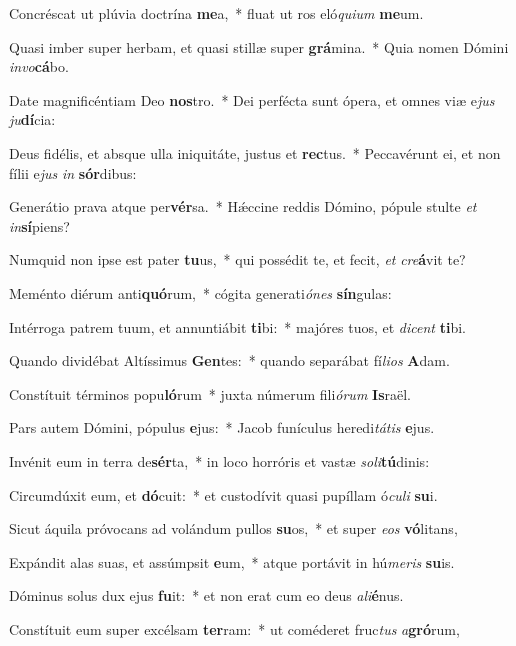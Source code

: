 \item Concréscat ut plúvia doctrína \textbf{me}a,~* fluat ut ros eló\textit{qui}\textit{um} \textbf{me}um.
\item Quasi imber super herbam, et quasi stillæ super \textbf{grá}mina.~* Quia nomen Dómini \textit{in}\textit{vo}\textbf{cá}bo.
\item Date magnificéntiam Deo \textbf{nos}tro.~* Dei perfécta sunt ópera, et omnes viæ e\textit{jus} \textit{ju}\textbf{dí}cia:
\item Deus fidélis, et absque ulla iniquitáte, justus et \textbf{rec}tus.~* Peccavérunt ei, et non fílii e\textit{jus} \textit{in} \textbf{sór}dibus:
\item Generátio prava atque per\textbf{vér}sa.~* Hǽccine reddis Dómino, pópule stulte \textit{et} \textit{in}\textbf{sí}piens?
\item Numquid non ipse est pater \textbf{tu}us,~* qui possédit te, et fecit, \textit{et} \textit{cre}\textbf{á}vit te?
\item Meménto diérum anti\textbf{quó}rum,~* cógita generati\textit{ó}\textit{nes} \textbf{sín}gulas:
\item Intérroga patrem tuum, et annuntiábit \textbf{ti}bi:~* majóres tuos, et \textit{di}\textit{cent} \textbf{ti}bi.
\item Quando dividébat Altíssimus \textbf{Gen}tes:~* quando separábat fí\textit{li}\textit{os} \textbf{A}dam.
\item Constítuit términos popu\textbf{ló}rum~* juxta númerum fili\textit{ó}\textit{rum} \textbf{Is}raël.
\item Pars autem Dómini, pópulus \textbf{e}jus:~* Jacob funículus heredi\textit{tá}\textit{tis} \textbf{e}jus.
\item Invénit eum in terra de\textbf{sér}ta,~* in loco horróris et vastæ \textit{so}\textit{li}\textbf{tú}dinis:
\item Circumdúxit eum, et \textbf{dó}cuit:~* et custodívit quasi pupíllam ó\textit{cu}\textit{li} \textbf{su}i.
\item Sicut áquila próvocans ad volándum pullos \textbf{su}os,~* et super \textit{e}\textit{os} \textbf{vó}litans,
\item Expándit alas suas, et assúmpsit \textbf{e}um,~* atque portávit in hú\textit{me}\textit{ris} \textbf{su}is.
\item Dóminus solus dux ejus \textbf{fu}it:~* et non erat cum eo deus \textit{a}\textit{li}\textbf{é}nus.
\item Constítuit eum super excélsam \textbf{ter}ram:~* ut coméderet fruc\textit{tus} \textit{a}\textbf{gró}rum,
